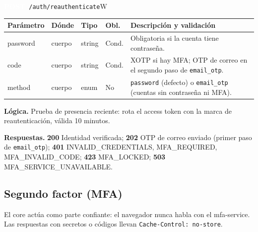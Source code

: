 \documentclass[11pt,a4paper]{report}
\newcommand{\verbo}[2]{\colorbox{#1}{\textcolor{white}{\ttfamily\bfseries\small #2}}}
\begin{document}
\begin{apiendpoint}{\verbo{verbpost}{POST}\ \texttt{/\allowbreak{}auth/\allowbreak{}reauthenticate}}{W}
\begin{tabularx}{\linewidth}{@{}>{\ttfamily\raggedright}p{3.0cm}p{1.35cm}p{1.9cm}p{0.9cm}X@{}}
\toprule \normalfont\bfseries Parámetro & \bfseries Dónde & \bfseries Tipo & \bfseries Obl. & \bfseries Descripción y validación\\ \midrule
password & cuerpo & string & Cond. & Obligatoria si la cuenta tiene contraseña.\\
code & cuerpo & string & Cond. & XOTP si hay MFA; OTP de correo en el segundo paso de \texttt{email\_otp}.\\
method & cuerpo & enum & No & \texttt{password} (defecto) o \texttt{email\_otp} (cuentas sin contraseña ni MFA).\\
\bottomrule\end{tabularx}
\par\smallskip\textbf{Lógica.} Prueba de presencia reciente: rota el access token con la marca de reautenticación, válida 10 minutos.
\par\smallskip\textbf{Respuestas.} \textbf{200} Identidad verificada; \textbf{202} OTP de correo enviado (primer paso de \texttt{email\_otp}); \textbf{401} INVALID\_CREDENTIALS, MFA\_REQUIRED, MFA\_INVALID\_CODE; \textbf{423} MFA\_LOCKED; \textbf{503} MFA\_SERVICE\_UNAVAILABLE.
\end{apiendpoint}
\subsection{Segundo factor (MFA)}
El core actúa como parte confiante: el navegador nunca habla con el mfa-service. Las respuestas con secretos o códigos llevan \texttt{Cache-Control: no-store}.
\end{document}
